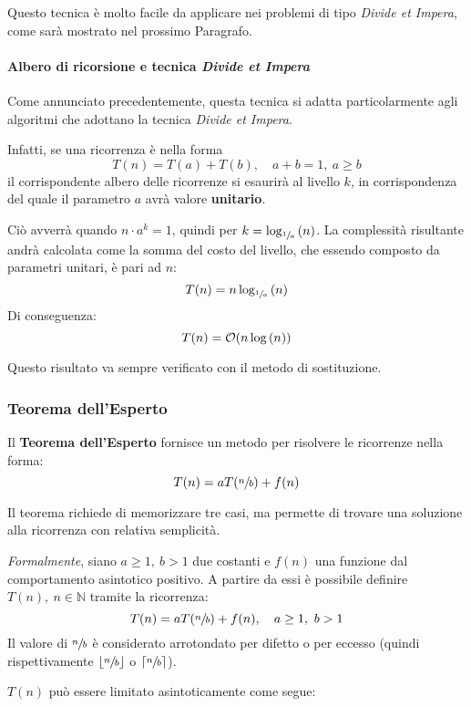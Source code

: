 \documentclass[italian, 10pt]{article}
\begin{document}
\bigskip
Questo tecnica è molto facile da applicare nei problemi di tipo \textit{Divide et Impera}, come sarà mostrato nel prossimo Paragrafo.

\paragraph{Albero di ricorsione e tecnica \textit{Divide et Impera}}

Come annunciato precedentemente, questa tecnica si adatta particolarmente agli algoritmi che adottano la tecnica \textit{Divide et Impera}.

Infatti, se una ricorrenza è nella forma
\[ T(n) = T(a) + T(b),\quad a + b = 1,\ a \geq b \]
il corrispondente albero delle ricorrenze si esaurirà al livello \(k\), in corrispondenza del quale il parametro \(a\) avrà valore \textbf{unitario}.

Ciò avverrà quando \(n \cdot a^k = 1\), quindi per \(k = \log_{\sfrac{1}{a}}{(n)}\).
La complessità risultante andrà calcolata come la somma del costo del livello, che essendo composto da parametri unitari, è pari ad \(n\):
\[ T(n) = n \log_{\sfrac{1}{a}}{(n)} \]
Di conseguenza:
\[ T(n) = \mathcal{O}(n \log{(n)})  \]

Questo risultato va sempre verificato con il metodo di sostituzione.

\subsubsection{Teorema dell'Esperto}
\label{sec:teorema-dell-esperto}

Il \textbf{Teorema dell'Esperto} fornisce un metodo  per risolvere le ricorrenze nella forma:
\[ T(n) = aT(\sfrac{n}{b}) + f(n)\]

Il teorema richiede di memorizzare tre casi, ma permette di trovare una soluzione alla ricorrenza con relativa semplicità.

\bigskip
\textit{Formalmente}, siano \(a \geq 1,\ b > 1\) due costanti e \(f(n)\) una funzione dal comportamento asintotico positivo.
A partire da essi è possibile definire \(T(n),\ n \in \mathbb{N}\) tramite la ricorrenza:
\[ T(n) = aT(\sfrac{n}{b}) + f(n) , \quad a \geq 1,\ b > 1 \]
Il valore di \(\sfrac{n}{b}\) è considerato arrotondato per difetto o per eccesso (quindi rispettivamente \(\lfloor\sfrac{n}{b}\rfloor\) o \(\lceil\sfrac{n}{b}\rceil\)).

\(T(n)\) può essere limitato asintoticamente come segue:
\end{document}
